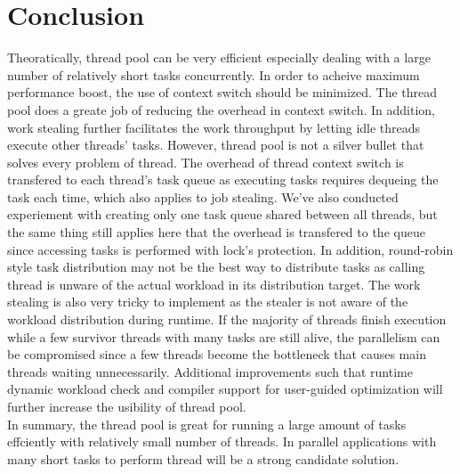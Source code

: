 \documentclass[journal, a4paper]{IEEEtran}
\begin{document}
\section{Conclusion}
	Theoratically, thread pool can be very efficient especially dealing with a large number of relatively short tasks concurrently. In order to acheive maximum performance boost, the use of context switch should be minimized. The thread pool does a greate job of reducing the overhead in context switch. In addition, work stealing further facilitates the work throughput by letting idle threads execute other threads' tasks. However, thread pool is not a silver bullet that solves every problem of thread. The overhead of thread context switch is transfered to each thread's task queue as executing tasks requires dequeing the task each time, which also applies to job stealing. We've also conducted experiement with creating only one task queue shared between all threads, but the same thing still applies here that the overhead is transfered to the queue since accessing tasks is performed with lock's protection. In addition, round-robin style task distribution may not be the best way to distribute tasks as calling thread is unware of the actual workload in its distribution target. The work stealing is also very tricky to implement as the stealer is not aware of the workload distribution during runtime. If the majority of threads finish execution while a few survivor threads with many tasks are still alive, the parallelism can be compromised since a few threads become the bottleneck that causes main threads waiting unnecessarily. Additional improvements such that runtime dynamic workload check and compiler support for user-guided optimization will further increase the usibility of thread pool.\\
	
	In summary, the thread pool is great for running a large amount of tasks effciently with relatively small number of threads. In parallel applications with many short tasks to perform thread will be a strong candidate solution.

\end{document}
